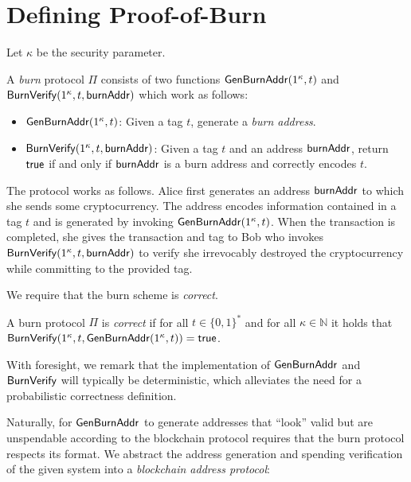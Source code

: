 \section{Defining Proof-of-Burn}

Let $\kappa$ be the security parameter.

\begin{definition}
  A \emph{burn} protocol $\Pi$ consists of two functions $\mathsf{Gen}\-\mathsf{Burn}\-\mathsf{Addr}(1^\kappa, t)$ and $\mathsf{BurnVerify}(1^\kappa, t, \mathsf{burnAddr})$ which work as follows:

  \begin{itemize}
    \item $\mathsf{Gen}\-\mathsf{Burn}\-\mathsf{Addr}(1^\kappa, t)$: Given a tag $t$, generate a \emph{burn address}.

    \item $\mathsf{BurnVerify}(1^\kappa, t, \mathsf{burnAddr})$: Given a tag $t$ and an address $\mathsf{burnAddr}$, return $\sf{true}$ if and only if $\mathsf{burnAddr}$ is a burn address and correctly encodes $t$.
  \end{itemize}
\end{definition}

The protocol works as follows. Alice first generates an address $\mathsf{burnAddr}$ to which she sends some cryptocurrency. The address encodes information contained in a tag $t$ and is generated by invoking $\mathsf{Gen}\-\mathsf{Burn}\-\mathsf{Addr}(1^\kappa, t)$. When the transaction is completed, she gives the transaction and tag to Bob who invokes $\mathsf{BurnVerify}(1^\kappa, t, \mathsf{burnAddr})$ to verify she irrevocably destroyed the cryptocurrency while committing to the provided tag.

We require that the burn scheme is \emph{correct}.

\begin{definition}[Correctness]
  A burn protocol $\Pi$ is \emph{correct} if for all $t \in \{0,1\}^*$ and for all $\kappa \in \mathbb{N}$ it holds that
  $\mathsf{BurnVerify}(1^\kappa, t, \mathsf{Gen}\-\mathsf{Burn}\-\mathsf{Addr}(1^\kappa, t)) = \mathsf{true}$.
\end{definition}

With foresight, we remark that the implementation of $\mathsf{Gen}\-\mathsf{Burn}\-\mathsf{Addr}$ and $\mathsf{BurnVerify}$ will typically be deterministic, which alleviates the need for a probabilistic correctness definition.

Naturally, for $\mathsf{Gen}\-\mathsf{Burn}\-\mathsf{Addr}$ to generate addresses that ``look'' valid but are unspendable according to the blockchain protocol requires that the burn protocol respects its format. We abstract the address generation and spending verification of the given system into a \emph{blockchain address protocol}:

